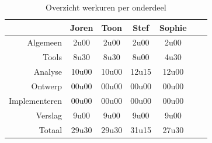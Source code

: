 \documentclass[i1]{oss}
\begin{document}
\begin{table}[h!]
\begin{center}
    \begin{tabular}{ r | c  c  c  c  c  c}
     & Joren & Toon & Stef & Sophie \\ \hline
    Algemeen & 2u00 & 2u00 & 2u00 & 2u00\\
   	Tools & 8u30 & 8u30 & 8u00 & 4u30 \\
	Analyse & 10u00 & 10u00 & 12u15 & 12u00 \\
	Ontwerp & 00u00 & 00u00 & 00u00 & 00u00 \\
	Implementeren & 00u00 & 00u00 & 00u00 & 00u00\\
	Verslag & 9u00 & 9u00 & 9u00 & 9u00 \\
	Totaal & 29u30 & 29u30 & 31u15 & 27u30  
    \end{tabular}
    \caption{Overzicht werkuren per onderdeel}
    \label{tab:werkuren}
\end{center}
\end{table}
\end{document}
